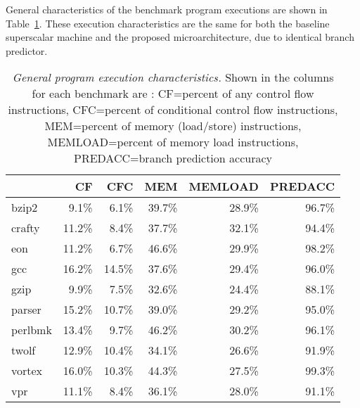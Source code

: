 \documentclass[10pt,dvips]{article}
\begin{document}
General characteristics of the benchmark program
executions are shown in Table~\ref{tab:general}.
These execution characteristics are the same for 
both the baseline superscalar machine
and the proposed microarchitecture, due to identical 
branch predictor.
%
\begin{table}[p]
\begin{center}
\caption{{\em General program execution characteristics.}
Shown in the columns for each benchmark are :
CF=percent of any control flow instructions, 
CFC=percent of conditional control flow instructions, 
MEM=percent of memory (load/store) instructions,
MEMLOAD=percent of memory load instructions, 
PREDACC=branch prediction accuracy}
\label{tab:general}
\vspace{+0.1in}
\scriptsize {
\begin{tabular}{|l||r|r|r|r|r|}
\hline 
 & CF & CFC & MEM & MEMLOAD & PREDACC \\
\hline

\hline
bzip2&
9.1\%	& 6.1\%	& 39.7\%	& 28.9\%	& 96.7\% \\

\hline
crafty&
11.2\%	& 8.4\%	& 37.7\%	& 32.1\%	& 94.4\% \\

\hline
eon&
11.2\%	& 6.7\%	& 46.6\%	& 29.9\%	& 98.2\% \\

\hline
gcc&
16.2\%	& 14.5\%	& 37.6\%	& 29.4\%	& 96.0\% \\

\hline
gzip&
9.9\%	& 7.5\%	& 32.6\%	& 24.4\%	& 88.1\% \\

\hline
parser&
15.2\%	& 10.7\%	& 39.0\%	& 29.2\%	& 95.0\% \\

\hline
perlbmk&
13.4\%	& 9.7\%	& 46.2\%	& 30.2\%	& 96.1\% \\

\hline
twolf&
12.9\%	& 10.4\%	& 34.1\%	& 26.6\%	& 91.9\% \\

\hline
vortex&
16.0\%	& 10.3\%	& 44.3\%	& 27.5\%	& 99.3\% \\

\hline
vpr&
11.1\%	& 8.4\%	& 36.1\%	& 28.0\%	& 91.1\% \\

\hline
\end{tabular}
}
\end{center}
\end{table}
%
\end{document}
